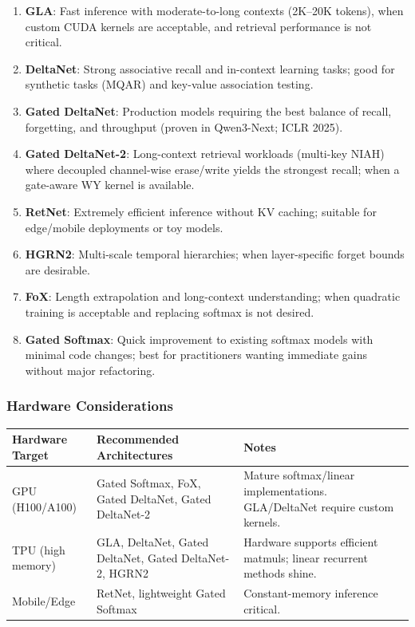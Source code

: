 \begin{enumerate}[leftmargin=*]
    \item \textbf{GLA}: Fast inference with moderate-to-long contexts (2K--20K tokens), when custom CUDA kernels are acceptable, and retrieval performance is not critical.
    \item \textbf{DeltaNet}: Strong associative recall and in-context learning tasks; good for synthetic tasks (MQAR) and key-value association testing.
    \item \textbf{Gated DeltaNet}: Production models requiring the best balance of recall, forgetting, and throughput (proven in Qwen3-Next; ICLR 2025).
    \item \textbf{Gated DeltaNet-2}: Long-context retrieval workloads (multi-key NIAH) where decoupled channel-wise erase/write yields the strongest recall; when a gate-aware WY kernel is available.
    \item \textbf{RetNet}: Extremely efficient inference without KV caching; suitable for edge/mobile deployments or toy models.
    \item \textbf{HGRN2}: Multi-scale temporal hierarchies; when layer-specific forget bounds are desirable.
    \item \textbf{FoX}: Length extrapolation and long-context understanding; when quadratic training is acceptable and replacing softmax is not desired.
    \item \textbf{Gated Softmax}: Quick improvement to existing softmax models with minimal code changes; best for practitioners wanting immediate gains without major refactoring.
\end{enumerate}

\subsubsection{Hardware Considerations}

\begin{table}[H]
\centering
\small
\begin{tabularx}{0.95\linewidth}{Xp{3.5cm}p{3.5cm}}
\toprule
\textbf{Hardware Target} & \textbf{Recommended Architectures} & \textbf{Notes} \\
\midrule
GPU (H100/A100) & Gated Softmax, FoX, Gated DeltaNet, Gated DeltaNet-2 & Mature softmax/linear implementations. GLA/DeltaNet require custom kernels. \\
TPU (high memory) & GLA, DeltaNet, Gated DeltaNet, Gated DeltaNet-2, HGRN2 & Hardware supports efficient matmuls; linear recurrent methods shine. \\
Mobile/Edge & RetNet, lightweight Gated Softmax & Constant-memory inference critical. \\
\bottomrule
\end{tabularx}
\end{table}

